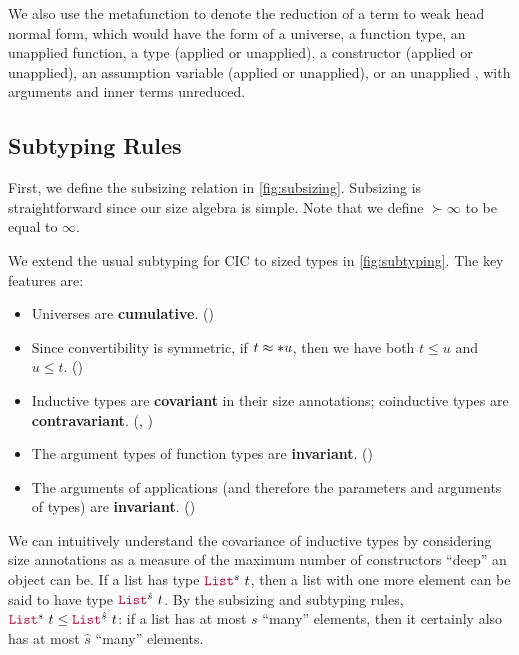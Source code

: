 We also use the metafunction \whnf to denote the reduction of a term to weak head normal form, which would have the form of a universe, a function type, an unapplied function, a \coinductive type (applied or unapplied), a constructor (applied or unapplied), an assumption variable (applied or unapplied), or an unapplied \cofixpoint, with arguments and inner terms unreduced.

\subsection{Subtyping Rules}\label{subsec:typing:subtyping}



First, we define the subsizing relation in \autoref{fig:subsizing}.
Subsizing is straightforward since our size algebra is simple.
Note that we define $\succ{\infty}$ to be equal to $\infty$.



We extend the usual subtyping for CIC to sized types in \autoref{fig:subtyping}.
The key features are:

\begin{itemize}
    \item Universes are \textbf{cumulative}. ()
    \item Since convertibility is symmetric, if $t \mathrel{\approx}* u$, then we have both $t \leq u$ and $u \leq t$. ()
    \item Inductive types are \textbf{covariant} in their size annotations; coinductive types are \textbf{contravariant}. (, )
    \item The argument types of function types are \textbf{invariant}. ()
    \item The arguments of applications (and therefore the parameters and arguments of \coinductive types) are \textbf{invariant}. ()
\end{itemize}

We can intuitively understand the covariance of inductive types by considering size annotations as a measure of the maximum number of constructors ``deep'' an object can be.
If a list has type $\List^s ~ t$, then a list with one more element can be said to have type $\List^{\hat{s}} ~ t$.
By the subsizing and subtyping rules, $\List^s ~ t \leq \List^{\hat{s}} ~ t$: if a list has at most $s$ ``many'' elements, then it certainly also has at most $\hat{s}$ ``many'' elements.

